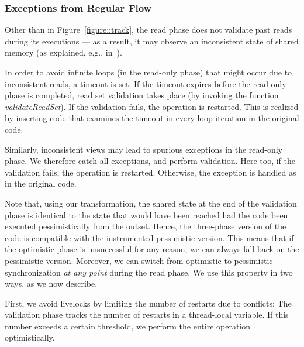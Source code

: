 \subsubsection{Exceptions from Regular Flow}
\label{sssec:alg-abnormal}


Other than in Figure~\ref{figure::track}, the read phase does not validate past reads during its executions ---
as a result, it may observe an inconsistent state of shared memory (as explained, e.g., in~\cite{HLR:SLCA2010}).
%

In order to avoid infinite loops (in the read-only phase) that might occur due to inconsistent reads, a timeout is set.
If the timeout expires before the read-only phase is completed, read set
validation takes place (by invoking the function \emph{validateReadSet}). If the validation fails, the operation is restarted.
This is realized by inserting code that examines the timeout in every loop iteration in the original code.

Similarly, inconsistent views may lead to spurious exceptions in the read-only phase. We therefore catch all exceptions, and
perform validation. Here too, if the validation fails, the operation is restarted. Otherwise, the exception is handled as in
the original code.


Note that, using our transformation, the shared state at the end of the validation phase
is identical to the state that would have been reached had the code been executed pessimistically from
the outset. Hence, the three-phase version of the code is compatible with the instrumented
pessimistic version. This means that if the optimistic phase is unsuccessful for any reason, we can always
fall back on the pessimistic version. Moreover, we can switch from optimistic to pessimistic synchronization
\emph{at any point} during the read phase.
We use this property in two ways, as we now describe.

First, we avoid livelocks by limiting the number of restarts due to conflicts:
The validation phase tracks the number of restarts in a thread-local variable.
If this number exceeds a certain threshold, we perform the entire operation optimistically.

